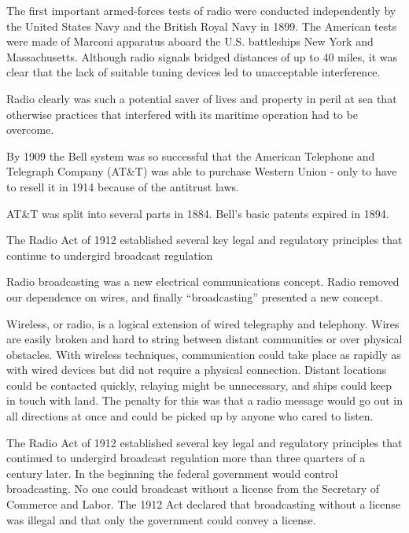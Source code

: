 \documentclass[a4paper,norsk,utf8]{report}
\begin{document}
    The first important armed-forces tests of radio were conducted
    independently by the United States Navy and the British Royal
    Navy in 1899.  The American tests were made of Marconi apparatus
    aboard the U.S. battleships New York and Massachusetts.  Although
    radio signals bridged distances of up to 40 miles, it was clear
    that the lack of suitable tuning devices led to unacceptable
    interference.

    Radio clearly was such a potential saver of lives and property in peril
    at sea that otherwise practices that interfered with its maritime
    operation had to be overcome.

    By 1909 the Bell system was so successful that the American
    Telephone and Telegraph Company (AT\&T) was able to purchase
    Western Union - only to have to resell it in 1914 because of the
    antitrust laws.

    AT\&T was split into several parts in 1884.  Bell's basic patents
    expired in 1894.

    The Radio Act of 1912 established several key legal and regulatory
    principles that continue to undergird broadcast regulation

    Radio broadcasting was a new electrical communications concept.
    Radio removed our dependence on wires, and finally ``broadcasting''
    presented a new concept.

    Wireless, or radio, is a logical extension of wired telegraphy and
    telephony.  Wires are easily broken and hard to string between
    distant communities or over physical obstacles.  With wireless
    techniques, communication could take place as rapidly as with
    wired devices but did not require a physical connection.  Distant
    locations could be contacted quickly, relaying might be unnecessary,
    and ships could keep in touch with land.  The penalty for this was
    that a radio message would go out in all directions at once and could
    be picked up by anyone who cared to listen.

    The Radio Act of 1912 established several key legal and regulatory
    principles that continued to undergird broadcast regulation more
    than three quarters of a century later.  In the beginning the
    federal government would control broadcasting.  No one could
    broadcast without a license from the Secretary of Commerce and
    Labor.   The 1912 Act declared that broadcasting without a license
    was illegal and that only the government could convey a license.
\end{document}

